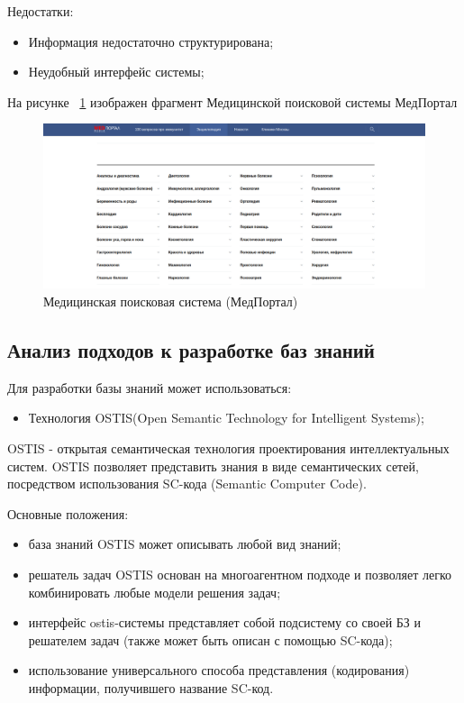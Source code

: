 \begin{enumerate}
{\begin{itemize}
		\end{itemize}
		Недостатки:
		\begin{itemize}
			\item{Информация недостаточно структурирована;}
			\item {Неудобный интерфейс системы;}\\
		\end{itemize}
		На рисунке ~\ref{fig:sections/medportal} изображен фрагмент Медицинской поисковой системы МедПортал
		\begin{figure}[H]
    	\centering
    	\includegraphics[width=1.0\textwidth]{sections/medportal}
    	\caption{Медицинская поисковая система (МедПортал)}
     	\label{fig:sections/medportal}
    \end{figure}}

\end{enumerate}


\subsection{Анализ подходов к разработке баз знаний}
Для разработки базы знаний может использоваться:
\begin{itemize}
    \item Технология OSTIS(Open Semantic Technology for Intelligent Systems);
\end{itemize}
OSTIS - открытая семантическая технология проектирования интеллектуальных систем. OSTIS позволяет представить знания в виде семантических сетей, посредством использования SC-кода (Semantic Computer Code).
 
Основные положения:
\begin{itemize}
	\item база знаний OSTIS может описывать любой вид знаний; 
	\item решатель задач OSTIS основан на многоагентном подходе и позволяет легко комбинировать любые модели решения задач;
	\item интерфейс ostis-системы представляет собой подсистему со своей БЗ и решателем задач (также может быть описан с помощью SC-кода);
	\item использование универсального способа представления (кодирования) информации, получившего название SC-код.\cite{OSTIS}
\end{itemize}

